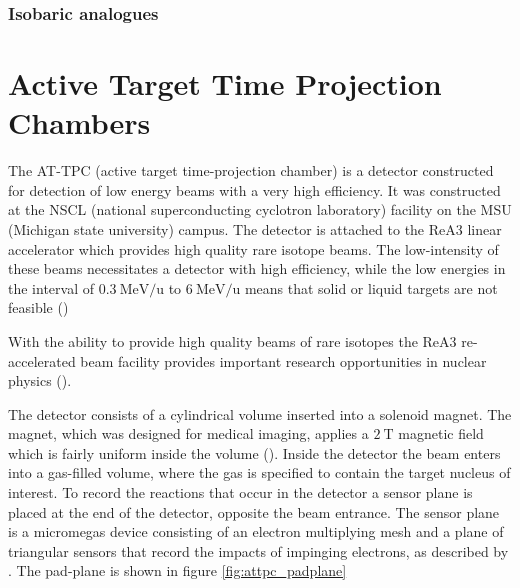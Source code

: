 \subsubsection{Isobaric analogues}

\section{Active Target Time Projection Chambers}\label{sec:attpc}

The AT-TPC (active target time-projection chamber) is a detector constructed for detection of low energy beams with a very high efficiency. It was constructed at the NSCL (national superconducting cyclotron laboratory) facility on the MSU (Michigan state university) campus. The detector is attached to the ReA3 linear accelerator which provides high quality rare isotope beams. The low-intensity of these beams necessitates a detector with high efficiency, while the low energies in the interval of $\SI[per-mode=symbol]{0.3}{\MeV \per \atomicmassunit}$ to $\SI[per-mode=symbol]{6}{\MeV \per \atomicmassunit}$ means that solid or liquid targets are not feasible (\cite{Bradt2017a})

 With the ability to provide high quality beams of rare isotopes the ReA3 re-accelerated beam facility  provides important research opportunities in nuclear physics (\cite{Kester2010}). 

 The detector consists of a cylindrical volume inserted into a solenoid magnet. The magnet, which was designed for medical imaging, applies a $\SI{2}{\tesla}$ magnetic field which is fairly uniform inside the volume (\cite{Bradt2017a}). Inside the detector the beam enters into a gas-filled volume, where the gas is specified to contain the target nucleus of interest. To record the reactions that occur in the detector a sensor plane is placed at the end of the detector, opposite the beam entrance. The sensor plane is a micromegas device consisting of an electron multiplying mesh and a plane of triangular sensors that record the impacts of impinging electrons, as described by \citet{Giomataris1996}. The pad-plane is shown in figure \ref{fig:attpc_padplane}

